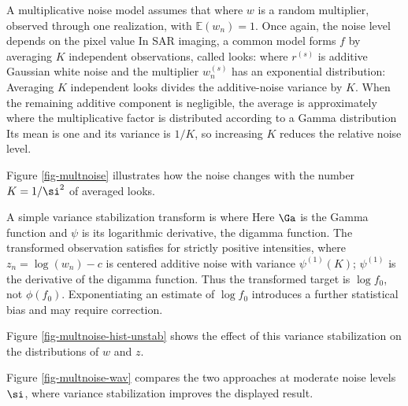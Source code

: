 A multiplicative noise model assumes that
where $w$ is a random multiplier, observed through one realization, with $\mathbb E(w_n)=1$.
Once again, the noise level depends on the pixel value
In SAR imaging, a common model forms $f$ by averaging $K$ independent observations, called looks:
where $r^{(s)}$ is additive Gaussian white noise and the multiplier $w^{(s)}_n$ has an exponential distribution:
Averaging $K$ independent looks divides the additive-noise variance by $K$. When the remaining additive component is negligible, the average is approximately
where the multiplicative factor is distributed according to a Gamma distribution
Its mean is one and its variance is $1/K$, so increasing $K$ reduces the relative noise level.


Figure \ref{fig-multnoise} illustrates how the noise changes with the number $K=1/\si^2$ of averaged looks.

A simple variance stabilization transform is
where
Here $\Ga$ is the Gamma function and $\psi$ is its logarithmic derivative, the digamma function. The transformed observation satisfies
for strictly positive intensities, where $z_n=\log(w_n)-c$ is centered additive noise with variance $\psi^{(1)}(K)$; $\psi^{(1)}$ is the derivative of the digamma function. Thus the transformed target is $\log f_0$, not $\phi(f_0)$. Exponentiating an estimate of $\log f_0$ introduces a further statistical bias and may require correction.


Figure \ref{fig-multnoise-hist-unstab} shows the effect of this variance stabilization on the distributions of $w$ and $z$.

Figure \ref{fig-multnoise-wav} compares the two approaches at moderate noise levels $\si$, where variance stabilization improves the displayed result.



